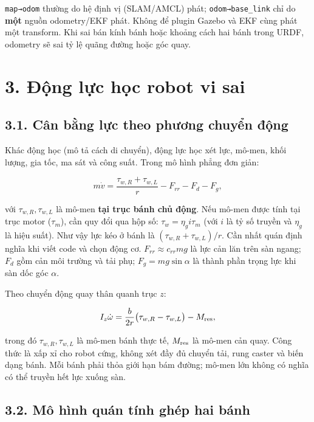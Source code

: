 \documentclass[
  12pt,
  a4paper,
]{article}
\begin{document}
\texttt{map→odom} thường do hệ định vị (SLAM/AMCL) phát;
\texttt{odom→base\_link} chỉ do \textbf{một} nguồn odometry/EKF phát.
Không để plugin Gazebo và EKF cùng phát một transform. Khi sai bán kính
bánh hoặc khoảng cách hai bánh trong URDF, odometry sẽ sai tỷ lệ quãng
đường hoặc góc quay.

\section{3. Động lực học robot vi
sai}\label{ux111ux1ed9ng-lux1ef1c-hux1ecdc-robot-vi-sai}

\subsection{3.1. Cân bằng lực theo phương chuyển
động}\label{cuxe2n-bux1eb1ng-lux1ef1c-theo-phux1b0ux1a1ng-chuyux1ec3n-ux111ux1ed9ng}

Khác động học (mô tả cách di chuyển), động lực học xét lực, mô-men, khối
lượng, gia tốc, ma sát và công suất. Trong mô hình phẳng đơn giản:

\[
m\dot{v}=\frac{\tau_{w,R}+\tau_{w,L}}{r}-F_{rr}-F_d-F_g,
\]

với \(\tau_{w,R},\tau_{w,L}\) là mô-men \textbf{tại trục bánh chủ động}.
Nếu mô-men được tính tại trục motor (\(\tau_m\)), cần quy đổi qua hộp
số: \(\tau_w=\eta_g i\tau_m\) (với \(i\) là tỷ số truyền và \(\eta_g\)
là hiệu suất). Như vậy lực kéo ở bánh là \((\tau_{w,R}+\tau_{w,L})/r\).
Cần nhất quán định nghĩa khi viết code và chọn động cơ.
\(F_{rr}\approx c_{rr}mg\) là lực cản lăn trên sàn ngang; \(F_d\) gồm
cản môi trường và tải phụ; \(F_g=mg\sin\alpha\) là thành phần trọng lực
khi sàn dốc góc \(\alpha\).

Theo chuyển động quay thân quanh trục \(z\):

\[
I_z\dot{\omega}=\frac{b}{2r}\big(\tau_{w,R}-\tau_{w,L}\big)-M_{\rm res},
\]

trong đó \(\tau_{w,R},\tau_{w,L}\) là mô-men bánh thực tế,
\(M_{\rm res}\) là mô-men cản quay. Công thức là xấp xỉ cho robot cứng,
không xét đầy đủ chuyển tải, rung caster và biến dạng bánh. Mỗi bánh
phải thỏa giới hạn bám đường; mô-men lớn không có nghĩa có thể truyền
hết lực xuống sàn.

\subsection{3.2. Mô hình quán tính ghép hai
bánh}\label{muxf4-huxecnh-quuxe1n-tuxednh-ghuxe9p-hai-buxe1nh}
\end{document}
